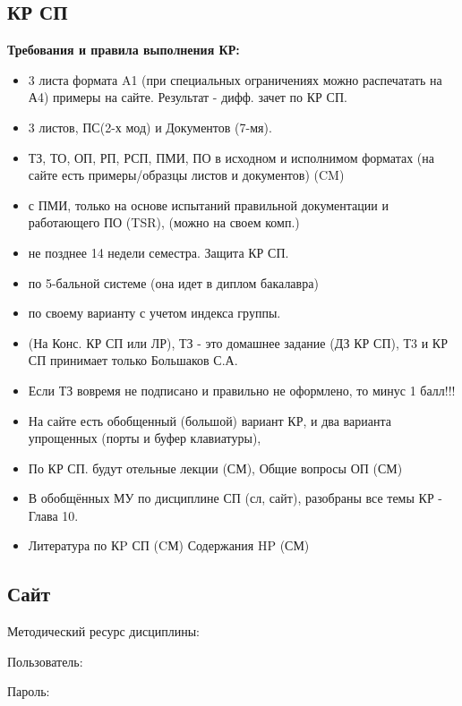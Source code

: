 \subsection{КР СП}

\textbf{Требования и правила выполнения КР:}
\begin{itemize}
    \item {} 3 листа формата A1 (при специальных ограничениях можно распечатать на А4) примеры на сайте. Результат - дифф. зачет по КР СП.
    \item {} 3 листов, ПС(2-х мод) и Документов (7-мя).
    \item {} ТЗ, ТО, ОП, РП, РСП, ПМИ, ПО в исходном и исполнимом форматах (на сайте есть примеры/образцы листов и документов) (CM)
    \item {} с ПМИ, только на основе испытаний правильной документации и работающего ПО (TSR), (можно на своем комп.)
    \item {} не позднее 14 недели семестра. Защита КР СП.
    \item {} по 5-бальной системе (она идет в диплом бакалавра)
    \item {} по своему варианту с учетом индекса группы.
    \item {} (На Конс. КР СП или ЛР), ТЗ - это домашнее задание (ДЗ КР СП), Т3 и КР СП принимает только Большаков С.А.
    \item Если ТЗ вовремя не подписано и правильно не оформлено, то минус 1 балл!!!
    \item На сайте есть обобщенный (большой) вариант КР, и два варианта упрощенных (порты и буфер клавиатуры),
    \item По КР СП. будут отельные лекции (СМ), Общие вопросы ОП (СМ)
    \item В обобщённых МУ по дисциплине СП (сл, сайт), разобраны все темы КР - Глава 10.
    \item Литература по КP СП (CМ) Содержания HP (СМ)
\end{itemize}

\subsection{Сайт}

Методический ресурс дисциплины: 

Пользователь: 

Пароль: 